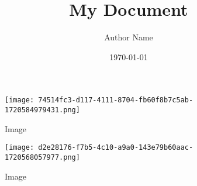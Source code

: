 \documentclass{article}
\title{My Document}\author{Author Name}\date{\today}
\begin{document}
\begin{wrapfigure}{l}{0.5364995602462621\textwidth}
\centering
\texttt{[image: 74514fc3-d117-4111-8704-fb60f8b7c5ab-1720584979431.png]}
\caption{Image}
\end{wrapfigure}

\begin{wrapfigure}{r}{0.5668449197860963\textwidth}
\centering
\texttt{[image: d2e28176-f7b5-4c10-a9a0-143e79b60aac-1720568057977.png]}
\caption{Image}
\end{wrapfigure}
\end{document}
